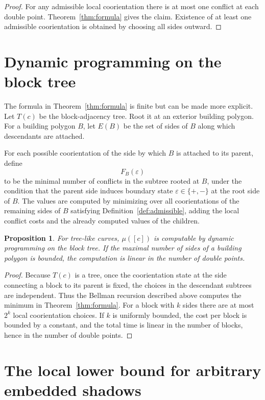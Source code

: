 \documentclass[11pt]{article}
\newtheorem{proposition}[theorem]{Proposition}
\begin{document}
\begin{proof}
For any admissible local coorientation there is at most one conflict at each double point.  Theorem~\ref{thm:formula} gives the claim.  Existence of at least one admissible coorientation is obtained by choosing all sides outward.
\end{proof}

\section{Dynamic programming on the block tree}

The formula in Theorem~\ref{thm:formula} is finite but can be made more explicit.  Let $T(c)$ be the block-adjacency tree.  Root it at an exterior building polygon.  For a building polygon $B$, let $E(B)$ be the set of sides of $B$ along which descendants are attached.

For each possible coorientation of the side by which $B$ is attached to its parent, define
\[
 F_B(\varepsilon)
\]
to be the minimal number of conflicts in the subtree rooted at $B$, under the condition that the parent side induces boundary state $\varepsilon\in\{+,-\}$ at the root side of $B$.  The values are computed by minimizing over all coorientations of the remaining sides of $B$ satisfying Definition~\ref{def:admissible}, adding the local conflict costs and the already computed values of the children.

\begin{proposition}\label{prop:dp}
For tree-like curves, $\mu([c])$ is computable by dynamic programming on the block tree.  If the maximal number of sides of a building polygon is bounded, the computation is linear in the number of double points.
\end{proposition}

\begin{proof}
Because $T(c)$ is a tree, once the coorientation state at the side connecting a block to its parent is fixed, the choices in the descendant subtrees are independent.  Thus the Bellman recursion described above computes the minimum in Theorem~\ref{thm:formula}.  For a block with $k$ sides there are at most $2^k$ local coorientation choices.  If $k$ is uniformly bounded, the cost per block is bounded by a constant, and the total time is linear in the number of blocks, hence in the number of double points.
\end{proof}



\section{The local lower bound for arbitrary embedded shadows}
\end{document}
